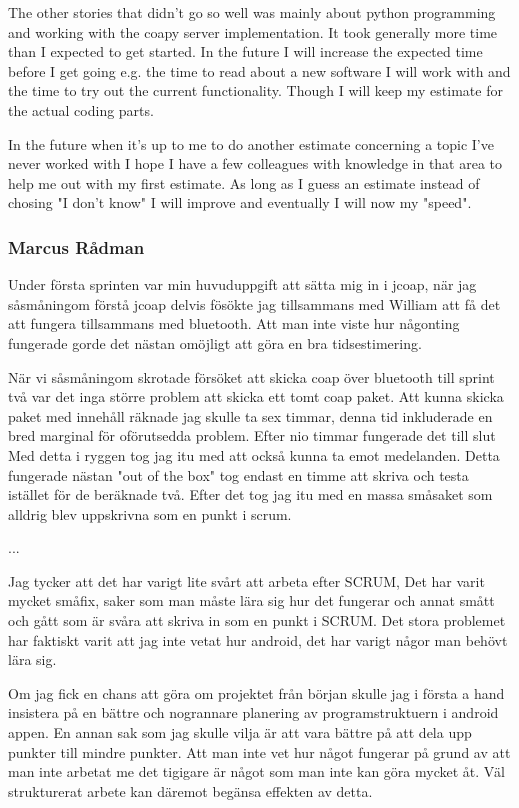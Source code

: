 The other stories that didn't go so well was mainly about python programming and working with the coapy server implementation. 
It took generally more time than I expected to get started.
In the future I will increase the expected time before I get going e.g. the time to read about a new software I will work with and the time to try out the current functionality.
Though I will keep my estimate for the actual coding parts.

In the future when it's up to me to do another estimate concerning a topic I've never worked with I hope I have a few colleagues with knowledge in that area to help me out with my first estimate.
As long as I guess an estimate instead of chosing "I don't know" I will improve and eventually I will now my "speed".

\subsubsection{Marcus Rådman}
Under första sprinten var min huvuduppgift att sätta mig in i jcoap, när jag såsmåningom förstå jcoap delvis fösökte jag tillsammans med William att få det att fungera tillsammans med bluetooth.
Att man inte viste hur någonting fungerade gorde det nästan omöjligt att göra en bra tidsestimering. 

När vi såsmåningom skrotade försöket att skicka coap över bluetooth till sprint två var det inga större problem att skicka ett tomt coap paket.
Att kunna skicka paket med innehåll räknade jag skulle ta sex timmar, denna tid inkluderade en bred marginal för oförutsedda problem. Efter nio timmar fungerade det till slut
Med detta i ryggen tog jag itu med att också kunna ta emot medelanden. Detta fungerade nästan "out of the box" tog endast en timme att skriva och testa istället för de beräknade två.
Efter det tog jag itu med en massa småsaket som alldrig blev uppskrivna som en punkt i scrum.

...

Jag tycker att det har varigt lite svårt att arbeta efter SCRUM, 
Det har varit mycket småfix, saker som man måste lära sig hur det fungerar och annat smått och gått som är svåra att skriva in som en punkt i SCRUM.
Det stora problemet har faktiskt varit att jag inte vetat hur android, det har varigt någor man behövt lära sig. 

Om jag fick en chans att göra om projektet från början skulle jag i första a hand insistera på en bättre och nogrannare planering av programstruktuern i android appen.
En annan sak som jag skulle vilja är att vara bättre på att dela upp punkter till mindre punkter.
Att man inte vet hur något fungerar på grund av att man inte arbetat me det tigigare är något som man inte kan göra mycket åt. Väl strukturerat arbete kan däremot begänsa effekten av detta.
